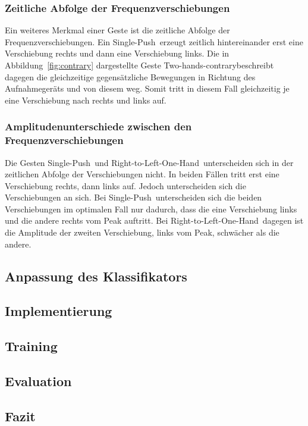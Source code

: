 \subsubsection*{Zeitliche Abfolge der Frequenzverschiebungen}
Ein weiteres Merkmal einer Geste ist die zeitliche Abfolge der Frequenzverschiebungen. Ein \glqq Single-Push\grqq\ erzeugt zeitlich hintereinander erst eine Verschiebung rechts und dann eine Verschiebung links. Die in Abbildung~\ref{fig:contrary} dargestellte Geste \glqq Two-hands-contrary\grqq beschreibt dagegen die gleichzeitige gegensätzliche Bewegungen in Richtung des Aufnahmegeräts und von diesem weg. Somit tritt in diesem Fall gleichzeitig je eine Verschiebung nach rechts und links auf. 


\subsubsection*{Amplitudenunterschiede zwischen den Frequenzverschiebungen}
Die Gesten \glqq Single-Push\grqq\ und \glqq Right-to-Left-One-Hand\grqq\ unterscheiden sich in der zeitlichen Abfolge der Verschiebungen nicht. In beiden Fällen tritt erst eine Verschiebung rechts, dann links auf. Jedoch unterscheiden sich die Verschiebungen an sich. Bei \glqq Single-Push\grqq\ unterscheiden sich die beiden Verschiebungen im optimalen Fall nur dadurch, dass die eine Verschiebung links und die andere rechts vom Peak auftritt. Bei \glqq Right-to-Left-One-Hand\grqq\ dagegen ist die Amplitude der zweiten Verschiebung, links vom Peak, schwächer als die andere.

\subsection{Anpassung des Klassifikators}

\subsection{Implementierung}


\subsection{Training}

\subsection{Evaluation}

\subsection{Fazit}


